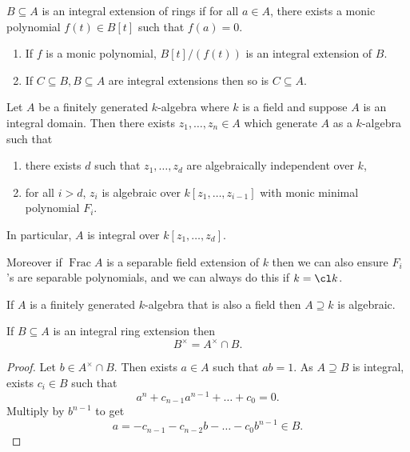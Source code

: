 \documentclass[a4paper]{article}
\begin{document}
\begin{definition}
  \(B \subseteq A\) is an integral extension of rings if for all \(a \in A\), there exists a monic polynomial \(f(t) \in B[t]\) such that \(f(a) = 0\).
\end{definition}

\begin{lemma}\leavevmode
  \begin{enumerate}
  \item If \(f\) is a monic polynomial, \(B[t]/(f(t))\) is an integral extension of \(B\).
  \item If \(C \subseteq B, B \subseteq A\) are integral extensions then so is \(C \subseteq A\).
  \end{enumerate}
\end{lemma}

\begin{theorem}
  Let \(A\) be a finitely generated \(k\)-algebra where \(k\) is a field and suppose \(A\) is an integral domain. Then there exists \(z_1, \dots, z_n \in A\) which generate \(A\) as a \(k\)-algebra such that
  \begin{enumerate}
  \item there exists \(d\) such that \(z_1, \dots, z_d\) are algebraically independent over \(k\),
  \item for all \(i > d\), \(z_i\) is algebraic over \(k[z_1, \dots, z_{i - 1}]\) with monic minimal polynomial \(F_i\).
  \end{enumerate}
  In particular, \(A\) is integral over \(k[z_1, \dots, z_d]\).

  Moreover if \(\operatorname{Frac} A\) is a separable field extension of \(k\) then we can also ensure \(F_i\)'s are separable polynomials, and we can always do this if \(k = \cl k\).
\end{theorem}

\begin{corollary}[Nullstellensatz]
  If \(A\) is a finitely generated \(k\)-algebra that is also a field then \(A \supseteq k\) is algebraic.
\end{corollary}

\begin{lemma}
  If \(B \subseteq A\) is an integral ring extension then
  \[
    B^\times = A^\times \cap B.
  \]
\end{lemma}

\begin{proof}
  Let \(b \in A^\times \cap B\). Then exists \(a \in A\) such that \(ab = 1\). As \(A \supseteq B\) is integral, exists \(c_i \in B\) such that
  \[
    a^n + c_{n - 1} a^{n - 1} + \dots + c_0 = 0.
  \]
  Multiply by \(b^{n - 1}\) to get
  \[
    a = -c_{n - 1} - c_{n - 2} b - \dots - c_0b^{n - 1} \in B.
  \]
\end{proof}
\end{document}

